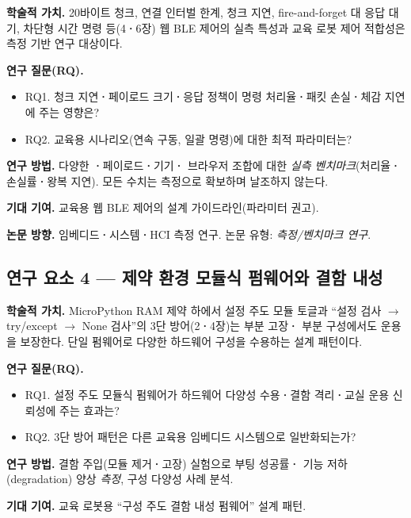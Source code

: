 \noindent\textbf{학술적 가치.} 20바이트 청크, 연결 인터벌 한계, 청크 지연,
fire-and-forget 대 응답 대기, 차단형 시간 명령 등(4\textbf{·}6장) 웹 BLE 제어의
실측 특성과 교육 로봇 제어 적합성은 측정 기반 연구 대상이다.

\noindent\textbf{연구 질문(RQ).}
\begin{itemize}
  \item RQ1. 청크 지연\textbf{·}페이로드 크기\textbf{·}응답 정책이 명령 처리율\textbf{·}패킷
        손실\textbf{·}체감 지연에 주는 영향은?
  \item RQ2. 교육용 시나리오(연속 구동, 일괄 명령)에 대한 최적 파라미터는?
\end{itemize}

\noindent\textbf{연구 방법.} 다양한 \textbf{·}페이로드\textbf{·}기기\textbf{·}
브라우저 조합에 대한 \emph{실측 벤치마크}(처리율\textbf{·}손실률\textbf{·}왕복 지연). 모든
수치는 측정으로 확보하며 날조하지 않는다.

\noindent\textbf{기대 기여.} 교육용 웹 BLE 제어의 설계 가이드라인(파라미터 권고).

\noindent\textbf{논문 방향.} 임베디드\textbf{·}시스템\textbf{·}HCI 측정 연구.
논문 유형: \emph{측정/벤치마크 연구}.

\subsection{연구 요소 4 --- 제약 환경 모듈식 펌웨어와 결함 내성}

\noindent\textbf{학술적 가치.} MicroPython RAM 제약 하에서 설정 주도 모듈 토글과
``설정 검사 $\to$ try/except $\to$ None 검사''의 3단 방어(2\textbf{·}4장)는 부분 고장\textbf{·}
부분 구성에서도 운용을 보장한다. 단일 펌웨어로 다양한 하드웨어 구성을 수용하는
설계 패턴이다.

\noindent\textbf{연구 질문(RQ).}
\begin{itemize}
  \item RQ1. 설정 주도 모듈식 펌웨어가 하드웨어 다양성 수용\textbf{·}결함 격리\textbf{·}교실
        운용 신뢰성에 주는 효과는?
  \item RQ2. 3단 방어 패턴은 다른 교육용 임베디드 시스템으로 일반화되는가?
\end{itemize}

\noindent\textbf{연구 방법.} 결함 주입(모듈 제거\textbf{·}고장) 실험으로 부팅 성공률\textbf{·}
기능 저하(degradation) 양상 \emph{측정}, 구성 다양성 사례 분석.

\noindent\textbf{기대 기여.} 교육 로봇용 ``구성 주도 결함 내성 펌웨어'' 설계 패턴.

